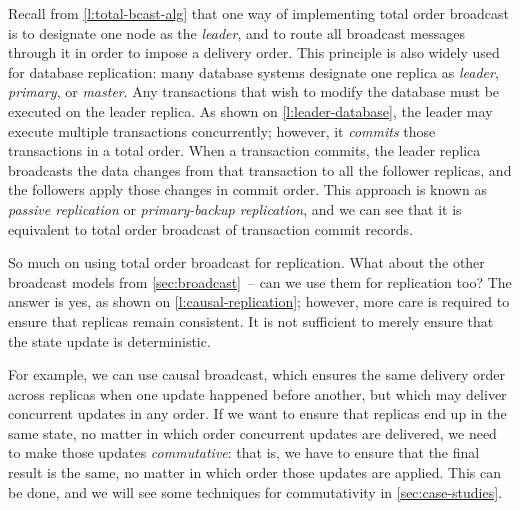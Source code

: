 Recall from \autoref{l:total-bcast-alg} that one way of implementing total order broadcast is to designate one node as the \emph{leader}, and to route all broadcast messages through it in order to impose a delivery order.
This principle is also widely used for database replication: many database systems designate one replica as \emph{leader}, \emph{primary}, or \emph{master}.
Any transactions that wish to modify the database must be executed on the leader replica.
As shown on \autoref{l:leader-database}, the leader may execute multiple transactions concurrently; however, it \emph{commits} those transactions in a total order.
When a transaction commits, the leader replica broadcasts the data changes from that transaction to all the follower replicas, and the followers apply those changes in commit order.
This approach is known as \emph{passive replication} or \emph{primary-backup replication}, and we can see that it is equivalent to total order broadcast of transaction commit records.

So much on using total order broadcast for replication.
What about the other broadcast models from \autoref{sec:broadcast}~-- can we use them for replication too?
The answer is yes, as shown on \autoref{l:causal-replication}; however, more care is required to ensure that replicas remain consistent.
It is not sufficient to merely ensure that the state update is deterministic.

For example, we can use causal broadcast, which ensures the same delivery order across replicas when one update happened before another, but which may deliver concurrent updates in any order.
If we want to ensure that replicas end up in the same state, no matter in which order concurrent updates are delivered, we need to make those updates \emph{commutative}: that is, we have to ensure that the final result is the same, no matter in which order those updates are applied.
This can be done, and we will see some techniques for commutativity in \autoref{sec:case-studies}.

